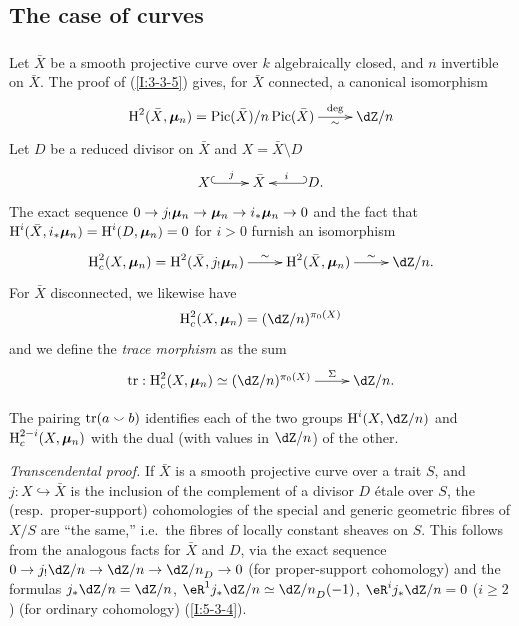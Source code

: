 \subsection{The case of curves}\label{I:6-2}





\subsubsection{}\label{I:6-2-1}

Let $\bar X$ be a smooth projective curve over $k$ algebraically closed, and
$n$ invertible on $\bar X$. The proof of (\ref{I:3-3-5}) gives, for
$\bar X$ connected, a canonical isomorphism
\[\xymatrix{
  \h^2(\bar X,\dmu_n) = \pic(\bar X)/n\pic(\bar X) \ar[r]^-{\deg}_-{\sim}
    & \dZ/n
}\]
Let $D$ be a reduced divisor on $\bar X$ and $X=\bar X\setminus D$ 
\[\xymatrix{
  X \ar@{^{(}->}[r]^-j 
    & \bar X 
    & \ar@{_{(}->}[l]_-i D \text{.}
}\]
The exact sequence $0\to j_! {\bm\mu}_n \to {\bm\mu}_n\to i_* {\bm\mu}_n\to 0$ and the fact
that $\operatorname{H}^i(\bar X,i_*{\bm\mu}_n) = \operatorname{H}^i(D,{\bm\mu}_n)=0$ for $i>0$ furnish an
isomorphism
\[\xymatrix{
  \h_c^2(X,\dmu_n) = \h^2(\bar X,j_! \dmu_n) \ar[r]^-\sim
    & \h^2(\bar X,\dmu_n) \ar[r]^-\sim
    & \dZ/n \text{.}
}\]
For $\bar X$ disconnected, we likewise have
\[
  \h_c^2(X,\dmu_n) = (\dZ/n)^{\pi_0(X)}
\]
and we define the \emph{trace morphism} as the sum
\[\xymatrix{
  \tr : \h_c^2(X,\dmu_n) \simeq (\dZ/n)^{\pi_0(X)} \ar[r]^-\Sigma
    & \dZ/n\text{.}
}\]





\begin{theorem}\label{I:6-2-2}
The pairing $\operatorname{tr}(a\smallsmile b)$ identifies each of the two groups
$\h^i(X,\dZ/n)$ and $\operatorname{H}_c^{2-i}(X,{\bm\mu}_n)$ with the dual (with values in
$\dZ/n$) of the other.
\end{theorem}

\emph{Transcendental proof.} If $\bar X$ is a smooth projective curve over
a trait $S$, and $j:X\hookrightarrow \bar X$ is the inclusion of the
complement of a divisor $D$ \'etale over $S$, the (resp.\ proper-support)
cohomologies of the special and generic geometric fibres
of $X/S$ are ``the same,'' i.e.\ the fibres of locally
constant sheaves on $S$. This follows from the analogous facts for
$\bar X$ and $D$, via the exact sequence $0\to j_! \dZ/n\to\dZ/n\to {\dZ/n}_D\to 0$
(for proper-support cohomology) and the formulas $j_*\dZ/n = \dZ/n$,
$\eR^1 j_* \dZ/n \simeq {\dZ/n}_D(-1)$, $\eR^i j_*\dZ/n = 0$ ($i\geqslant 2$)
(for ordinary cohomology) (\ref{I:5-3-4}).

